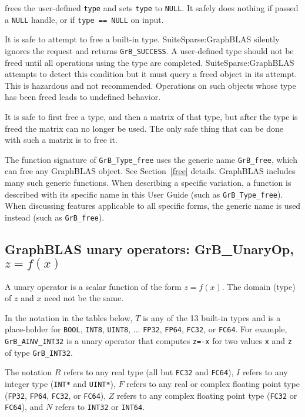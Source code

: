 \documentclass[12pt]{article}
\begin{document}
\noindent
frees the user-defined \verb'type' and
sets \verb'type' to \verb'NULL'.
It safely does nothing if passed a \verb'NULL'
handle, or if \verb'type == NULL' on input.

It is safe to attempt to free a built-in type.  SuiteSparse:GraphBLAS silently
ignores the request and returns \verb'GrB_SUCCESS'.  A user-defined type should
not be freed until all operations using the type are completed.
SuiteSparse:GraphBLAS attempts to detect this condition but it must query a
freed object in its attempt.  This is hazardous and not recommended.
Operations on such objects whose type has been freed leads to undefined
behavior.

It is safe to first free a type, and then a matrix of that type, but after the
type is freed the matrix can no longer be used.  The only safe thing that can
be done with such a matrix is to free it.

The function signature of \verb'GrB_Type_free' uses the generic name
\verb'GrB_free', which can free any GraphBLAS object. See Section~\ref{free}
details.  GraphBLAS includes many such generic functions.  When describing a
specific variation, a function is described with its specific name in this User
Guide (such as \verb'GrB_Type_free').  When discussing features applicable to
all specific forms, the generic name is used instead (such as \verb'GrB_free').

\newpage
\subsection{GraphBLAS unary operators: {\sf GrB\_UnaryOp}, $z=f(x)$} %
\label{unaryop}

A unary operator is a scalar function of the form $z=f(x)$.  The domain (type)
of $z$ and $x$ need not be the same.

In the notation in the tables
below, $T$ is any of the 13 built-in types and is a place-holder for
\verb'BOOL', \verb'INT8', \verb'UINT8', ...
\verb'FP32', \verb'FP64', \verb'FC32', or \verb'FC64'.
For example, \verb'GrB_AINV_INT32' is a unary operator that computes
\verb'z=-x' for two values \verb'x' and \verb'z' of type \verb'GrB_INT32'.

The notation $R$ refers to any real type (all but \verb'FC32' and \verb'FC64'),
$I$ refers to any integer type (\verb'INT*' and \verb'UINT*'),
$F$ refers to any real or complex floating point type
(\verb'FP32', \verb'FP64', \verb'FC32', or \verb'FC64'),
$Z$ refers to any complex floating point type
(\verb'FC32' or \verb'FC64'),
and $N$ refers to \verb'INT32' or \verb'INT64'.
\end{document}

